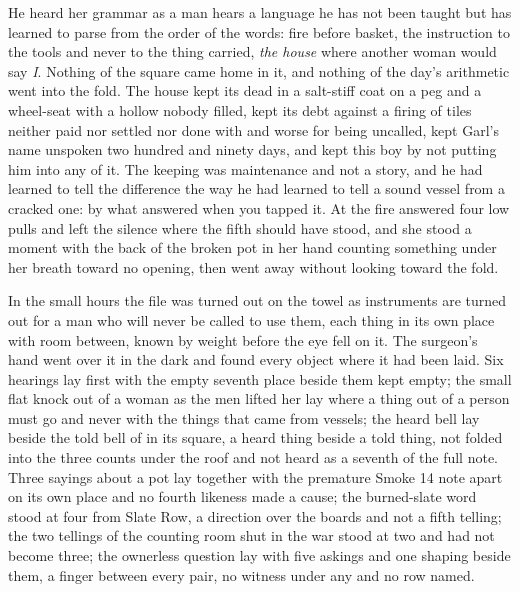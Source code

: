 He heard her grammar as a man hears a language he has not been taught but has learned to parse from the order of the words: fire before basket, the instruction to the tools and never to the thing carried, \emph{the house} where another woman would say \emph{I}. Nothing of the square came home in it, and nothing of the day's arithmetic went into the fold. The house kept its dead in a salt-stiff coat on a peg and a wheel-seat with a hollow nobody filled, kept its debt against a firing of tiles neither paid nor settled nor done with and worse for being uncalled, kept Garl's name unspoken two hundred and ninety days, and kept this boy by not putting him into any of it. The keeping was maintenance and not a story, and he had learned to tell the difference the way he had learned to tell a sound vessel from a cracked one: by what answered when you tapped it. At  the fire answered four low pulls and left the silence where the fifth should have stood, and she stood a moment with the back of the broken pot in her hand counting something under her breath toward no opening, then went away without looking toward the fold.

\scenebreak

In the small hours the file was turned out on the towel as instruments are turned out for a man who will never be called to use them, each thing in its own place with room between, known by weight before the eye fell on it. The surgeon's hand went over it in the dark and found every object where it had been laid. Six hearings lay first with the empty seventh place beside them kept empty; the small flat knock out of a woman as the men lifted her lay where a thing out of a person must go and never with the things that came from vessels; the heard bell lay beside the told bell of  in its square, a heard thing beside a told thing, not folded into the three counts under the roof and not heard as a seventh of the full note. Three sayings about a pot lay together with the premature Smoke 14 note apart on its own place and no fourth likeness made a cause; the burned-slate word stood at four from Slate Row, a direction over the boards and not a fifth telling; the two tellings of the counting room shut in the war stood at two and had not become three; the ownerless question lay with five askings and one shaping beside them, a finger between every pair, no witness under any and no row named.

